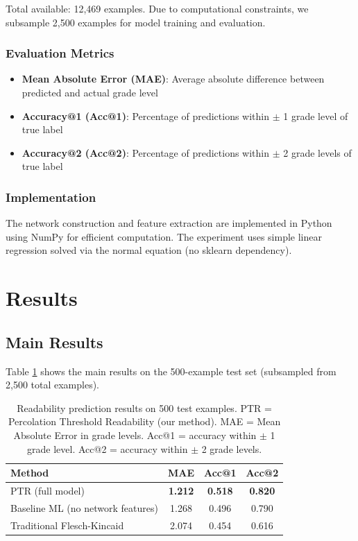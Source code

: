 \documentclass[11pt,letterpaper]{article}
\begin{document}
Total available: 12,469 examples. Due to computational constraints, we subsample 2,500 examples for model training and evaluation.

\subsubsection{Evaluation Metrics}

\begin{itemize}
\item \textbf{Mean Absolute Error (MAE)}: Average absolute difference between predicted and actual grade level
\item \textbf{Accuracy@1 (Acc@1)}: Percentage of predictions within $\pm$ 1 grade level of true label
\item \textbf{Accuracy@2 (Acc@2)}: Percentage of predictions within $\pm$ 2 grade levels of true label
\end{itemize}

\subsubsection{Implementation}

The network construction and feature extraction are implemented in Python using NumPy for efficient computation. The experiment uses simple linear regression solved via the normal equation (no sklearn dependency).

\section{Results}

\subsection{Main Results}

Table \ref{tab:main_results} shows the main results on the 500-example test set (subsampled from 2,500 total examples).

\begin{table}[!htbp]
\centering
\caption{Readability prediction results on 500 test examples. PTR = Percolation Threshold Readability (our method). MAE = Mean Absolute Error in grade levels. Acc@1 = accuracy within $\pm$ 1 grade level. Acc@2 = accuracy within $\pm$ 2 grade levels.}
\label{tab:main_results}
\begin{tabular}{lccc}
\toprule
Method & MAE & Acc@1 & Acc@2 \\
\midrule
PTR (full model) & \textbf{1.212} & \textbf{0.518} & \textbf{0.820} \\
Baseline ML (no network features) & 1.268 & 0.496 & 0.790 \\
Traditional Flesch-Kincaid & 2.074 & 0.454 & 0.616 \\
\bottomrule
\end{tabular}
\end{table}
\end{document}
